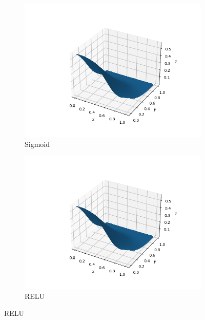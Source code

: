 \documentclass[../main.tex]{subfiles}
\begin{document}
\begin{figure}[htb!]
    \centering
    \begin{subfigure}[b]{0.48\textwidth}
        \centering
        \includegraphics[trim=2.4cm 1cm 1.4cm 1cm, clip,width=1.1\textwidth]{../assets/nn_sigmoid_franke_plot.png}
        \caption{Sigmoid}
        \label{fig:result_ols_plot}
    \end{subfigure}
    \quad
    \begin{subfigure}[b]{0.48\textwidth}
        \centering
        \includegraphics[trim=2.4cm 1cm 1.4cm 1cm, clip,width=1.1\textwidth]{../assets/nn_sigmoid_franke_plot.png}
        \caption{RELU}
    \end{subfigure}
    

\end{figure}
\end{document}
